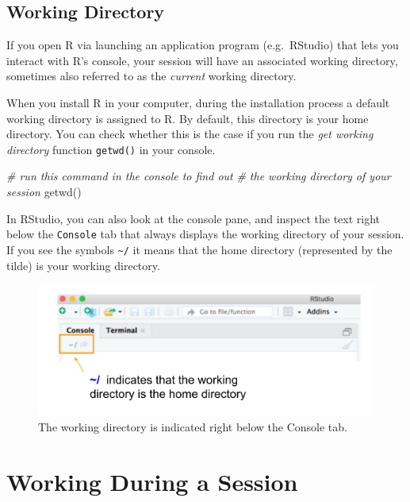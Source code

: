 \documentclass[
]{book}
\newenvironment{Shaded}{\begin{snugshade}}{\end{snugshade}}
\newcommand{\CommentTok}[1]{\textcolor[rgb]{0.56,0.35,0.01}{\textit{#1}}}
\newcommand{\FunctionTok}[1]{\textcolor[rgb]{0.00,0.00,0.00}{#1}}
\newcommand{\NormalTok}[1]{#1}
\begin{document}
\hypertarget{working-directory}{%
\subsection{Working Directory}\label{working-directory}}

If you open R via launching an application program (e.g.~RStudio) that lets
you interact with R's console, your session will have an associated working
directory, sometimes also referred to as the \emph{current} working directory.

When you install R in your computer, during the installation process a default
working directory is assigned to R. By default, this directory is your home
directory. You can check whether this is the case if you run the
\emph{get working directory} function \texttt{getwd()} in your console.

\begin{Shaded}
\begin{Highlighting}[]
\CommentTok{\# run this command in the console to find out }
\CommentTok{\# the working directory of your session}
\FunctionTok{getwd}\NormalTok{()}
\end{Highlighting}
\end{Shaded}

In RStudio, you can also look at the console pane, and inspect the text right
below the \texttt{Console} tab that always displays the working directory of your
session. If you see the symbols \texttt{\textasciitilde{}/} it means that the home directory
(represented by the tilde) is your working directory.

\begin{figure}

{\centering \includegraphics[width=0.7\linewidth]{images/rstudio/rstudio-console-working-directory} 

}

\caption{The working directory is indicated right below the Console tab.}\label{fig:unnamed-chunk-31}
\end{figure}

\hypertarget{working-during-a-session}{%
\section{Working During a Session}\label{working-during-a-session}}
\end{document}
